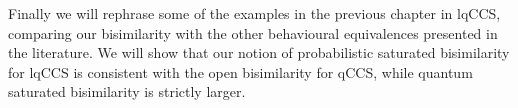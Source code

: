 Finally we will rephrase some of the examples in  the previous chapter in lqCCS, comparing our bisimilarity with the other behavioural equivalences presented in the literature. We will show that our notion of probabilistic saturated bisimilarity for lqCCS is consistent with the open bisimilarity  \cite{dengOpenBisimulationQuantum2012} for qCCS, while quantum saturated bisimilarity is strictly larger.